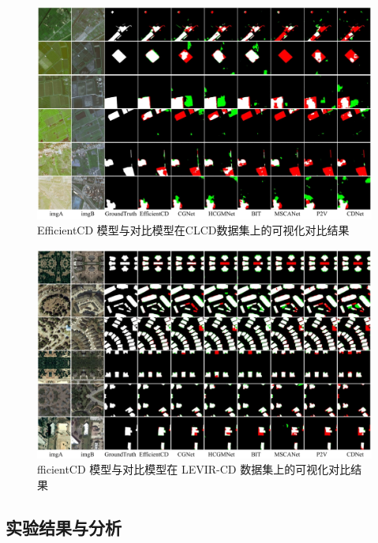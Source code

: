 \begin{figure}[!htb]
  \centering
  \includegraphics[width=\textwidth]{paper_figures/基于双时相遥感影像特征交互的变化检测算法研究/EfficientCD/efficientcd_clcd.png}
  \caption{EfficientCD 模型与对比模型在CLCD数据集上的可视化对比结果}
  \label{fig:efficientcd_clcd}
\end{figure}

\begin{figure}[!htb]
  \centering
  \includegraphics[width=\textwidth]{paper_figures/基于双时相遥感影像特征交互的变化检测算法研究/EfficientCD/efficientcd_levir.png}
  \caption{fficientCD 模型与对比模型在 LEVIR-CD 数据集上的可视化对比结果}
  \label{fig:efficientcd_levir}
\end{figure}

\subsection{实验结果与分析}


